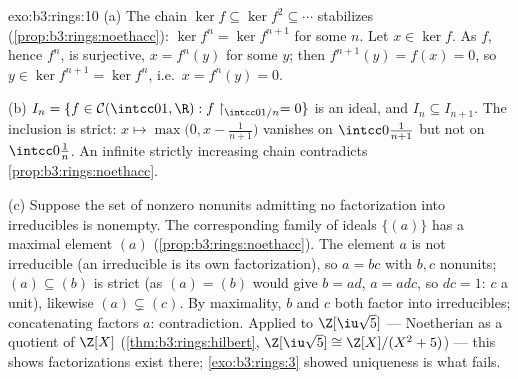 \begin{solution}{exo:b3:rings:10}
(a) The chain $\ker f \subseteq \ker f^2 \subseteq \cdots$
stabilizes (\cref{prop:b3:rings:noethacc}): $\ker f^n = \ker
f^{n+1}$ for some $n$. Let $x \in \ker f$. As $f$, hence $f^n$, is
surjective, $x = f^n(y)$ for some $y$; then $f^{n+1}(y) = f(x) =
0$, so $y \in \ker f^{n+1} = \ker f^n$, i.e.\ $x = f^n(y) = 0$.

(b) $I_n = \{f \in \mathcal C(\intcc01, \R) : f\restriction_{
\intcc0{1/n}} = 0\}$ is an ideal, and $I_n \subseteq I_{n+1}$. The
inclusion is strict: $x \mapsto \max\bigl(0, x -
\frac1{n+1}\bigr)$ vanishes on $\intcc0{\frac1{n+1}}$ but not on
$\intcc0{\frac1n}$. An infinite strictly increasing chain
contradicts \cref{prop:b3:rings:noethacc}.

(c) Suppose the set of nonzero nonunits admitting no factorization
into irreducibles is nonempty. The corresponding family of ideals
$\{(a)\}$ has a maximal element $(a)$
(\cref{prop:b3:rings:noethacc}). The element $a$ is not
irreducible (an irreducible is its own factorization), so $a = bc$
with $b, c$ nonunits; $(a) \subseteq (b)$ is strict (as $(a) =
(b)$ would give $b = ad$, $a = adc$, so $dc = 1$: $c$ a unit),
likewise $(a) \subsetneq (c)$. By maximality, $b$ and $c$ both
factor into irreducibles; concatenating factors $a$:
contradiction. Applied to $\Z[\iu\sqrt5]$ --- Noetherian as a
quotient of $\Z[X]$ (\cref{thm:b3:rings:hilbert}, $\Z[\iu\sqrt5]
\cong \Z[X]/(X^2+5)$) --- this shows factorizations exist there;
\cref{exo:b3:rings:3} showed uniqueness is what fails.
\end{solution}

